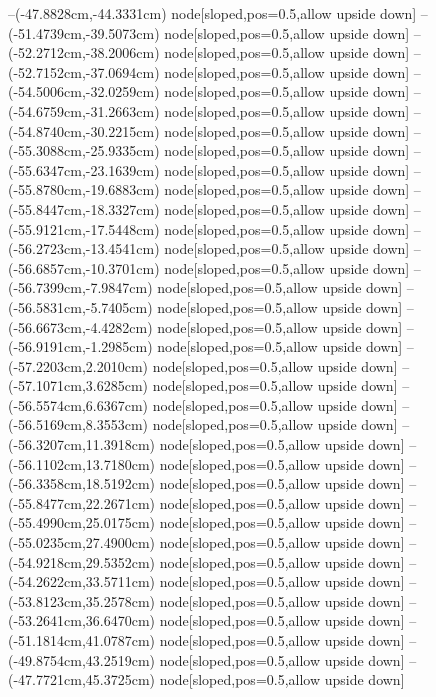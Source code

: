--(-47.8828cm,-44.3331cm) node[sloped,pos=0.5,allow upside down]{\ArrowIn}
--(-51.4739cm,-39.5073cm) node[sloped,pos=0.5,allow upside down]{\ArrowIn}
--(-52.2712cm,-38.2006cm) node[sloped,pos=0.5,allow upside down]{\ArrowIn}
--(-52.7152cm,-37.0694cm) node[sloped,pos=0.5,allow upside down]{\ArrowIn}
--(-54.5006cm,-32.0259cm) node[sloped,pos=0.5,allow upside down]{\ArrowIn}
--(-54.6759cm,-31.2663cm) node[sloped,pos=0.5,allow upside down]{\arrowIn}
--(-54.8740cm,-30.2215cm) node[sloped,pos=0.5,allow upside down]{\ArrowIn}
--(-55.3088cm,-25.9335cm) node[sloped,pos=0.5,allow upside down]{\ArrowIn}
--(-55.6347cm,-23.1639cm) node[sloped,pos=0.5,allow upside down]{\ArrowIn}
--(-55.8780cm,-19.6883cm) node[sloped,pos=0.5,allow upside down]{\ArrowIn}
--(-55.8447cm,-18.3327cm) node[sloped,pos=0.5,allow upside down]{\ArrowIn}
--(-55.9121cm,-17.5448cm) node[sloped,pos=0.5,allow upside down]{\arrowIn}
--(-56.2723cm,-13.4541cm) node[sloped,pos=0.5,allow upside down]{\ArrowIn}
--(-56.6857cm,-10.3701cm) node[sloped,pos=0.5,allow upside down]{\ArrowIn}
--(-56.7399cm,-7.9847cm) node[sloped,pos=0.5,allow upside down]{\ArrowIn}
--(-56.5831cm,-5.7405cm) node[sloped,pos=0.5,allow upside down]{\ArrowIn}
--(-56.6673cm,-4.4282cm) node[sloped,pos=0.5,allow upside down]{\ArrowIn}
--(-56.9191cm,-1.2985cm) node[sloped,pos=0.5,allow upside down]{\ArrowIn}
--(-57.2203cm,2.2010cm) node[sloped,pos=0.5,allow upside down]{\ArrowIn}
--(-57.1071cm,3.6285cm) node[sloped,pos=0.5,allow upside down]{\ArrowIn}
--(-56.5574cm,6.6367cm) node[sloped,pos=0.5,allow upside down]{\ArrowIn}
--(-56.5169cm,8.3553cm) node[sloped,pos=0.5,allow upside down]{\ArrowIn}
--(-56.3207cm,11.3918cm) node[sloped,pos=0.5,allow upside down]{\ArrowIn}
--(-56.1102cm,13.7180cm) node[sloped,pos=0.5,allow upside down]{\ArrowIn}
--(-56.3358cm,18.5192cm) node[sloped,pos=0.5,allow upside down]{\ArrowIn}
--(-55.8477cm,22.2671cm) node[sloped,pos=0.5,allow upside down]{\ArrowIn}
--(-55.4990cm,25.0175cm) node[sloped,pos=0.5,allow upside down]{\ArrowIn}
--(-55.0235cm,27.4900cm) node[sloped,pos=0.5,allow upside down]{\ArrowIn}
--(-54.9218cm,29.5352cm) node[sloped,pos=0.5,allow upside down]{\ArrowIn}
--(-54.2622cm,33.5711cm) node[sloped,pos=0.5,allow upside down]{\ArrowIn}
--(-53.8123cm,35.2578cm) node[sloped,pos=0.5,allow upside down]{\ArrowIn}
--(-53.2641cm,36.6470cm) node[sloped,pos=0.5,allow upside down]{\ArrowIn}
--(-51.1814cm,41.0787cm) node[sloped,pos=0.5,allow upside down]{\ArrowIn}
--(-49.8754cm,43.2519cm) node[sloped,pos=0.5,allow upside down]{\ArrowIn}
--(-47.7721cm,45.3725cm) node[sloped,pos=0.5,allow upside down]{\ArrowIn}
